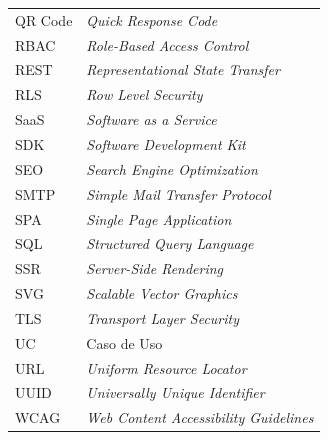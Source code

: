 \begin{tabular}{@{}p{2.2cm}p{10.5cm}@{}}
QR Code & \textit{Quick Response Code} \\
RBAC & \textit{Role-Based Access Control} \\
REST & \textit{Representational State Transfer} \\
RLS & \textit{Row Level Security} \\
SaaS & \textit{Software as a Service} \\
SDK & \textit{Software Development Kit} \\
SEO & \textit{Search Engine Optimization} \\
SMTP & \textit{Simple Mail Transfer Protocol} \\
SPA & \textit{Single Page Application} \\
SQL & \textit{Structured Query Language} \\
SSR & \textit{Server-Side Rendering} \\
SVG & \textit{Scalable Vector Graphics} \\
TLS & \textit{Transport Layer Security} \\
UC & Caso de Uso \\
URL & \textit{Uniform Resource Locator} \\
UUID & \textit{Universally Unique Identifier} \\
WCAG & \textit{Web Content Accessibility Guidelines} \\
\end{tabular}
\normalsize
